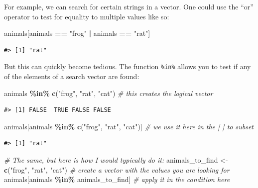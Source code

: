 \documentclass[
]{book}
\newenvironment{Shaded}{\begin{snugshade}}{\end{snugshade}}
\newcommand{\CommentTok}[1]{\textcolor[rgb]{0.56,0.35,0.01}{\textit{#1}}}
\newcommand{\FunctionTok}[1]{\textcolor[rgb]{0.13,0.29,0.53}{\textbf{#1}}}
\newcommand{\NormalTok}[1]{#1}
\newcommand{\OtherTok}[1]{\textcolor[rgb]{0.56,0.35,0.01}{#1}}
\newcommand{\SpecialCharTok}[1]{\textcolor[rgb]{0.81,0.36,0.00}{\textbf{#1}}}
\newcommand{\StringTok}[1]{\textcolor[rgb]{0.31,0.60,0.02}{#1}}
\begin{document}
For example, we can search for certain strings in a vector. One could use the
``or'' operator \texttt{\textbar{}} to test for equality to multiple values like so:

\begin{Shaded}
\begin{Highlighting}[]
\NormalTok{animals[animals }\SpecialCharTok{==} \StringTok{"frog"} \SpecialCharTok{|}\NormalTok{ animals }\SpecialCharTok{==} \StringTok{"rat"}\NormalTok{] }
\end{Highlighting}
\end{Shaded}

\begin{verbatim}
#> [1] "rat"
\end{verbatim}

But this can quickly become tedious. The function \texttt{\%in\%} allows you to test if any of the elements of a search vector are found:

\begin{Shaded}
\begin{Highlighting}[]
\NormalTok{animals }\SpecialCharTok{\%in\%} \FunctionTok{c}\NormalTok{(}\StringTok{"frog"}\NormalTok{, }\StringTok{"rat"}\NormalTok{, }\StringTok{"cat"}\NormalTok{) }\CommentTok{\# this creates the logical vector}
\end{Highlighting}
\end{Shaded}

\begin{verbatim}
#> [1] FALSE  TRUE FALSE FALSE
\end{verbatim}

\begin{Shaded}
\begin{Highlighting}[]
\NormalTok{animals[animals }\SpecialCharTok{\%in\%} \FunctionTok{c}\NormalTok{(}\StringTok{"frog"}\NormalTok{, }\StringTok{"rat"}\NormalTok{, }\StringTok{"cat"}\NormalTok{)] }\CommentTok{\# we use it here in the [ ] to subset}
\end{Highlighting}
\end{Shaded}

\begin{verbatim}
#> [1] "rat"
\end{verbatim}

\begin{Shaded}
\begin{Highlighting}[]
\CommentTok{\# The same, but here is how I would typically do it:}
\NormalTok{animals\_to\_find }\OtherTok{\textless{}{-}} \FunctionTok{c}\NormalTok{(}\StringTok{"frog"}\NormalTok{, }\StringTok{"rat"}\NormalTok{, }\StringTok{"cat"}\NormalTok{) }\CommentTok{\# create a vector with the values you are looking for}
\NormalTok{animals[animals }\SpecialCharTok{\%in\%}\NormalTok{ animals\_to\_find] }\CommentTok{\# apply it in the condition here}
\end{Highlighting}
\end{Shaded}
\end{document}
